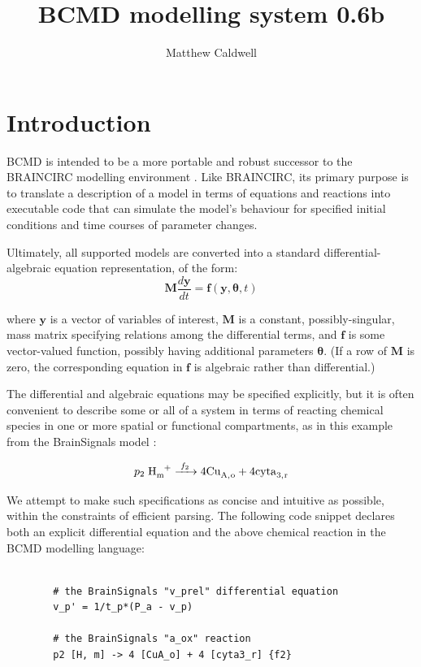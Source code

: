 \documentclass[a4paper,11pt]{article}
\title{BCMD modelling system 0.6b}
\author{Matthew Caldwell}
\newcommand{\vv}[1]{\mathbf{#1}}
\newcommand{\dd}[2]{\frac{d #1}{d #2}}
\begin{document}
\maketitle

\tableofcontents

\section{Introduction}\label{intro}

BCMD is intended to be a more portable and robust successor to the BRAINCIRC modelling environment \citep{Banaji:nuJzrisf}. Like BRAINCIRC, its primary purpose is to translate a description of a model in terms of equations and reactions into executable code that can simulate the model's behaviour for specified initial conditions and time courses of parameter changes.

Ultimately, all supported models are converted into a standard differential-algebraic equation representation, of the form:
\begin{equation}\label{eq:general}
\vv{M} \dd{\vv{y}}{t} = \vv{f}(\vv{y},\bm{\theta},t)
\end{equation}

where $\vv{y}$ is a vector of variables of interest, $\vv{M}$ is a constant, possibly-singular, mass matrix specifying relations among the differential terms, and $\vv{f}$ is some vector-valued function, possibly having additional parameters $\bm{\theta}$. (If a row of $\vv{M}$ is zero, the corresponding equation in $\vv{f}$ is algebraic rather than differential.)

The differential and algebraic equations may be specified explicitly, but it is often convenient to describe some or all of a system in terms of reacting chemical species in one or more spatial or functional compartments, as in this example from the BrainSignals model \citep[Appendix C]{Moroz:2013wx}:

\begin{equation}
p_2 \; \ce{H+_m ->[f_2] 4 Cu_{A,o} + 4 cyta_{3,r}}
\end{equation}

We attempt to make such specifications as concise and intuitive as possible, within the constraints of efficient parsing. The following code snippet declares both an explicit differential equation and the above chemical reaction in the BCMD modelling language:

\begin{verbatim}

        # the BrainSignals "v_prel" differential equation
        v_p' = 1/t_p*(P_a - v_p)
    
        # the BrainSignals "a_ox" reaction
        p2 [H, m] -> 4 [CuA_o] + 4 [cyta3_r] {f2}
        
\end{verbatim}
\end{document}
